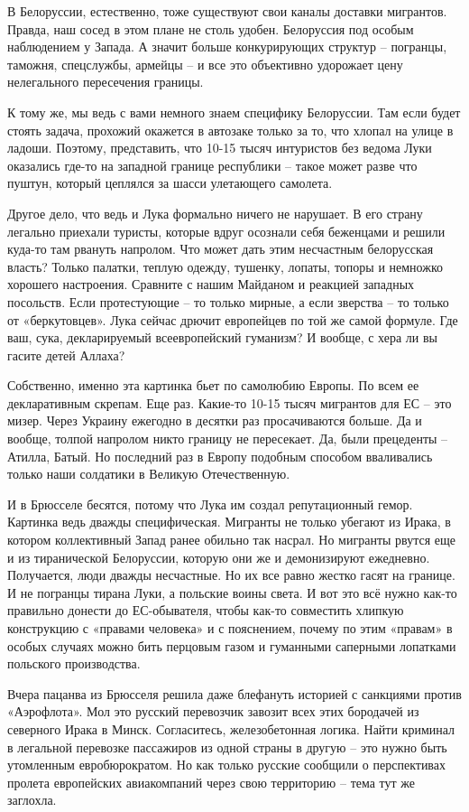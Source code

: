 В Белоруссии, естественно, тоже существуют свои каналы доставки мигрантов.
Правда, наш сосед в этом плане не столь удобен. Белоруссия под особым
наблюдением у Запада. А значит больше конкурирующих структур – погранцы,
таможня, спецслужбы, армейцы – и все это объективно удорожает цену нелегального
пересечения границы.

К тому же, мы ведь с вами немного знаем специфику Белоруссии. Там если будет
стоять задача, прохожий окажется в автозаке только за то, что хлопал на улице в
ладоши. Поэтому, представить, что 10-15 тысяч интуристов без ведома Луки
оказались где-то на западной границе республики – такое может разве что пуштун,
который цеплялся за шасси улетающего самолета.

Другое дело, что ведь и Лука формально ничего не нарушает. В его страну
легально приехали туристы, которые вдруг осознали себя беженцами и решили
куда-то там рвануть напролом. Что может дать этим несчастным белорусская
власть? Только палатки, теплую одежду, тушенку, лопаты, топоры и немножко
хорошего настроения. Сравните с нашим Майданом и реакцией западных посольств.
Если протестующие – то только мирные, а если зверства – то только от
«беркутовцев». Лука сейчас дрючит европейцев по той же самой формуле. Где ваш,
сука, декларируемый всеевропейский гуманизм? И вообще, с хера ли вы гасите
детей Аллаха?

Собственно, именно эта картинка бьет по самолюбию Европы. По всем ее
декларативным скрепам. Еще раз. Какие-то 10-15 тысяч мигрантов для ЕС – это
мизер. Через Украину ежегодно в десятки раз просачиваются больше. Да и вообще,
толпой напролом никто границу не пересекает. Да, были прецеденты – Атилла,
Батый. Но последний раз в Европу подобным способом вваливались только наши
солдатики в Великую Отечественную.

И в Брюсселе бесятся, потому что Лука им создал репутационный гемор. Картинка
ведь дважды специфическая. Мигранты не только убегают из Ирака, в котором
коллективный Запад ранее обильно так насрал. Но мигранты рвутся еще и из
тиранической Белоруссии, которую они же и демонизируют ежедневно. Получается,
люди дважды несчастные. Но их все равно жестко гасят на границе. И не погранцы
тирана Луки, а польские воины света. И вот это всё нужно как-то правильно
донести до ЕС-обывателя, чтобы как-то совместить хлипкую конструкцию с «правами
человека» и с пояснением, почему по этим «правам» в особых случаях можно бить
перцовым газом и гуманными саперными лопатками польского производства.

Вчера пацанва из Брюсселя решила даже блефануть историей с санкциями против
«Аэрофлота». Мол это русский перевозчик завозит всех этих бородачей из
северного Ирака в Минск. Согласитесь, железобетонная логика. Найти криминал в
легальной перевозке пассажиров из одной страны в другую – это нужно быть
утомленным евробюрократом. Но как только русские сообщили о перспективах
пролета европейских авиакомпаний через свою территорию – тема тут же заглохла.

